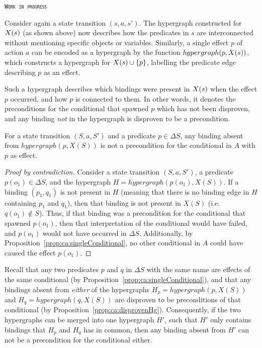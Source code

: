 \documentclass[../Master.tex]{subfiles}
\begin{document}
\textsc{\texttt{Work in progress}}

Consider again a state transition $\left( s, a, s' \right)$. The hypergraph constructed for $X(s)$ (as shown above) now describes how the predicates in $s$ are interconnected without mentioning specific objects or variables. Similarly, a single effect $p$ of action $a$ can be encoded as a hypergraph by the function $hypergraph(p,X(s))$, which constructs a hypergraph for $X(s) \cup \{p\}$, labelling the predicate edge describing $p$ as an effect.

Such a hypergraph describes which bindings were present in $X(s)$ when the effect $p$ occurred, and how $p$ is connected to them. In other words, it denotes the preconditions for the conditional that spawned $p$ which has not been disproven, and any binding \textit{not} in the hypergraph is disproven to be a precondition.

\begin{proposition}\label{prop:ca:disprovenHg}
    For a state transition $\left( S, a, S' \right)$ and a predicate $p \in \Delta S$, any binding absent from $hypergraph \left( p, X(S) \right)$ is not a precondition for the conditional in $A$ with $p$ as effect. 
\end{proposition}

\begin{proof}[Proof by contradiction]
    Consider a state transition $\left( S, a, S' \right)$, a predicate $p \left( o_1 \right) \in \Delta S$, and the hypergraph $H = hypergraph\left( p\left(o_1\right), X(S) \right)$. If a binding $(p_1, q_1)$ is not present in $H$ (meaning that there is no binding edge in $H$ containing $p_1$ and $q_1$), then that binding is not present in $X(S)$ (i.e.\ $q\left(o_1\right) \notin S$). Thus, if that binding was a precondition for the conditional that spawned $p\left(o_1\right)$, then that interpretation of the conditional would have failed, and $p\left( o_1 \right)$ would not have occurred in $\Delta S$. Additionally, by Proposition~\ref{prop:ca:singleConditional}, no other conditional in $A$ could have caused the effect $p \left(o_1\right)$.
\end{proof}

Recall that any two predicates $p$ and $q$ in $\Delta S$ with the same name are effects of the same conditional (by Proposition~\ref{prop:ca:singleConditional}), and that any bindings absent from \textit{either} of the hypergraphs $H_p = hypergraph(p, X(S))$ and $H_q = hypergraph(q, X(S))$ are disproven to be preconditions of that conditional (by Proposition~\ref{prop:ca:disprovenHg}). Consequently, if the two hypergraphs can be merged into one hypergraph $H'$, such that $H'$ only contains bindings that $H_p$ and $H_q$ has in common, then any binding absent from $H'$ can not be a precondition for the conditional either. 
\end{document}
